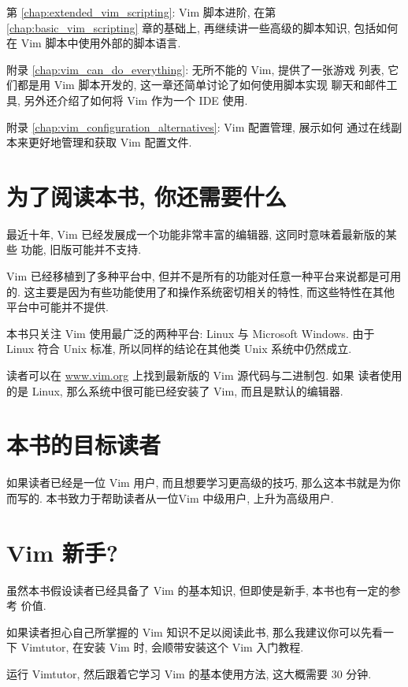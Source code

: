 第 \ref{chap:extended_vim_scripting}: Vim 脚本进阶, 在第
\ref{chap:basic_vim_scripting} 章的基础上, 再继续讲一些高级的脚本知识,
包括如何在 Vim 脚本中使用外部的脚本语言.

附录 \ref{chap:vim_can_do_everything}: 无所不能的 Vim, 提供了一张游戏
列表, 它们都是用 Vim 脚本开发的, 这一章还简单讨论了如何使用脚本实现
聊天和邮件工具, 另外还介绍了如何将 Vim 作为一个 IDE 使用.

附录 \ref{chap:vim_configuration_alternatives}: Vim 配置管理, 展示如何
通过在线副本来更好地管理和获取 Vim 配置文件.

\section*{为了阅读本书, 你还需要什么}
最近十年, Vim 已经发展成一个功能非常丰富的编辑器, 这同时意味着最新版的某些
功能, 旧版可能并不支持.

Vim 已经移植到了多种平台中, 但并不是所有的功能对任意一种平台来说都是可用
的. 这主要是因为有些功能使用了和操作系统密切相关的特性, 而这些特性在其他
平台中可能并不提供.

本书只关注 Vim 使用最广泛的两种平台: Linux 与 Microsoft Windows. 由于 Linux
符合 Unix 标准, 所以同样的结论在其他类 Unix 系统中仍然成立.

\begin{warning}
读者可以在 \url{www.vim.org} 上找到最新版的 Vim 源代码与二进制包. 如果
读者使用的是 Linux, 那么系统中很可能已经安装了 Vim, 而且是默认的编辑器.
\end{warning}

\section*{本书的目标读者}
\label{sec:who_this_book_is_for}
如果读者已经是一位 Vim 用户, 而且想要学习更高级的技巧, 那么这本书就是为你
而写的. 本书致力于帮助读者从一位Vim 中级用户, 上升为高级用户.

\section*{Vim 新手?}
\label{sec:new_to_vim}
虽然本书假设读者已经具备了 Vim 的基本知识, 但即使是新手, 本书也有一定的参考
价值.

如果读者担心自己所掌握的 Vim  知识不足以阅读此书, 那么我建议你可以先看一下
Vimtutor, 在安装 Vim 时, 会顺带安装这个 Vim 入门教程.

运行 Vimtutor, 然后跟着它学习 Vim 的基本使用方法, 这大概需要 30 分钟.

